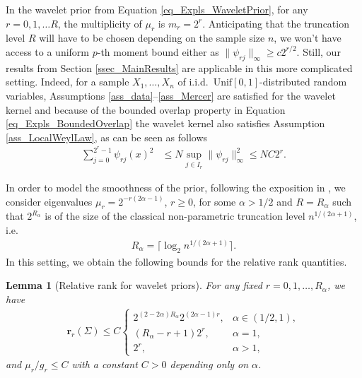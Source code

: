 \documentclass[a4paper,11pt]{article} %
\numberwithin{equation}{section}
\theoremstyle{definition}
\theoremstyle{remark}
\theoremstyle{plain}
\newtheorem{lemma}[definition]{Lemma}
\begin{document}
In the wavelet prior from Equation \eqref{eq_Expls_WaveletPrior}, for any \( r = 0, 1, \dots R \), the multiplicity of \( \mu_{r} \) is \( m_{r} = 2^{r}  \).
Anticipating that the truncation level \( R \) will have to be chosen depending on the sample size \( n \), we won't have access to a uniform \( p \)-th moment bound either as \( \| \psi_{r j} \|_{\infty} \ge c 2^{r/2} \).
Still, our results from Section \ref{ssec_MainResults} are applicable in this more complicated setting.
Indeed, for a sample \( X_{1}, \dots, X_{n} \) of i.i.d.~\(\text{Unif} [0, 1]\)-distributed random variables, Assumptions \ref{ass_data}--\ref{ass_Mercer} are satisfied for the wavelet kernel and because of the bounded overlap property in Equation \eqref{eq_Expls_BoundedOverlap} the wavelet kernel also satisfies Assumption \ref{ass_LocalWeylLaw}, as can be seen as follows 
\begin{align}
        \sum_{j = 0}^{2^{r} - 1} \psi_{r j}(x)^{2} 
  & \le N \sup_{j \in I_{r}} \| \psi_{r j} \|_{\infty}^{2} 
    \le N C 2^{r}.
\end{align}

In order to model the smoothness of the prior, following the exposition in \cite{GhosalvdVaart2017FundamentalsOfBayes}, we consider eigenvalues \( \mu_{r} = 2^{-r (2 \alpha - 1)} \), \( r \ge 0 \), for some \( \alpha > 1/2 \) and \( R = R_{\alpha} \) such that \( 2^{R_{\alpha}} \) is of the size of the classical non-parametric truncation level \( n^{1 / (2 \alpha + 1)} \), i.e. 
\begin{align}
  R_{\alpha} = \big\lceil \log_{2} n^{1 / (2 \alpha + 1)} \big\rceil.
\end{align}
In this setting, we obtain the following bounds for the relative rank quantities.

\begin{lemma}[Relative rank for wavelet priors]%
  \label{lem_RelativeRankForWaveletPriors}
  For any fixed \( r = 0, 1, \dots, R_{\alpha} \), we have
  \begin{align}
        \mathbf{r}_{r}(\Sigma) %
                    \le C \begin{cases}
                            2^{(2-2\alpha) R_{\alpha}} 2^{(2\alpha - 1) r}, & \alpha \in (1/2, 1), \\
                            (R_{\alpha} - r + 1) 2^{r},                     & \alpha =         1, \\
                            2^{r},                                          & \alpha >         1,
                          \end{cases}
  \end{align}
  and \(\mu_{r}/g_{r} \le C\) with a constant \( C > 0 \) depending only on \( \alpha \).  
\end{lemma}%
\end{document}
